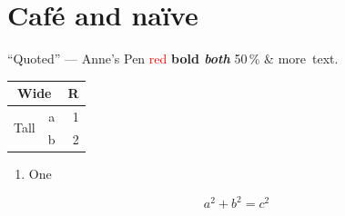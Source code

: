\documentclass[a4paper,11pt]{article}
\newcommand{\product}{Anne's Pen}
\begin{document}
\section*{Caf\'e and na\"ive}
``Quoted'' --- \product{} \textcolor{red}{red} {\bfseries bold \itshape both} 50\,\% \& more~text.
\begin{tabular}{|l|c|r|}\hline
\multicolumn{2}{|c|}{Wide} & R \\ \hline
\multirow{2}{*}{Tall} & a & 1 \\
 & b & 2 \\ \hline
\end{tabular}
\begin{enumerate}[label=(\roman*)]
\item One
\end{enumerate}
\begin{equation}a^2+b^2=c^2\end{equation}
\end{document}
